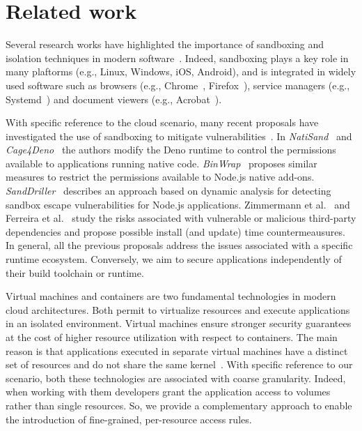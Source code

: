 \section{Related work}

Several research works have highlighted the importance of sandboxing
and isolation techniques in modern software~\cite{kim2013practical,
  lsm_fra, berman1995tron, RLBox, seapp, ALBANESE2020934}. Indeed,
sandboxing plays a key role in many plaftorms (e.g., Linux, Windows,
iOS, Android), and is integrated in widely used software such as
browsers (e.g., Chrome~\cite{chromium-sandbox},
Firefox~\cite{firefox-sandbox}), service managers (e.g.,
Systemd~\cite{systemd-sandbox}) and document viewers (e.g.,
Acrobat~\cite{acrobat-sandbox}).

With specific reference to the cloud scenario, many recent proposals
have investigated the use of sandboxing to mitigate
vulnerabilities~\cite{natisand, cage4deno, enhance-wasm-sandbox,
  sanddriller-staicu, staicu2021bilingual, binwrap, zimmermann-risks,
  npm-malicious-update}. In {\em NatiSand}~\cite{natisand} and {\em
  Cage4Deno}~\cite{cage4deno} the authors modify the Deno runtime to
control the permissions available to applications running native
code. {\em BinWrap}~\cite{binwrap} proposes similar measures to
restrict the permissions available to Node.js native add-ons.  {\em
  SandDriller}~\cite{sanddriller-staicu} describes an approach based
on dynamic analysis for detecting sandbox escape vulnerabilities for
Node.js applications. Zimmermann et al.~\cite{zimmermann-risks} and
Ferreira et al.~\cite{npm-malicious-update} study the risks associated
with vulnerable or malicious third-party dependencies and propose
possible install (and update) time countermeausures. In general, all
the previous proposals address the issues associated with a specific
runtime ecosystem. Conversely, we aim to secure applications
independently of their build toolchain or runtime.

Virtual machines and containers are two fundamental technologies in
modern cloud architectures. Both permit to virtualize resources and
execute applications in an isolated environment. Virtual machines
ensure stronger security guarantees at the cost of higher resource
utilization with respect to containers. The main reason is that
applications executed in separate virtual machines have a distinct set
of resources and do not share the same
kernel~\cite{casola-optimization, CASOLA2018235}.  With specific
reference to our scenario, both these technologies are associated with
coarse granularity. Indeed, when working with them developers grant
the application access to volumes rather than single resources. So, we
provide a complementary approach to enable the introduction of
fine-grained, per-resource access rules.

